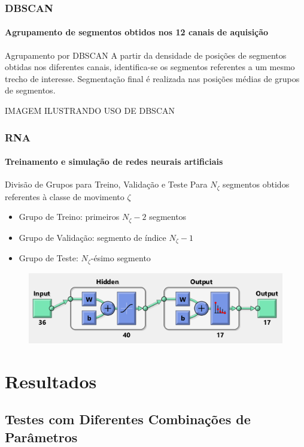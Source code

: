\documentclass{beamer}
\begin{document}
	\begin{frame}
		\frametitle{DBSCAN}
		\framesubtitle{Agrupamento de segmentos obtidos nos 12 canais de aquisição}
		\begin{exampleblock}{Agrupamento por DBSCAN}
			A partir da densidade de posições de segmentos obtidas nos diferentes canais, identifica-se os segmentos referentes a um mesmo trecho de interesse. Segmentação final é realizada nas posições médias de grupos de segmentos.
		\end{exampleblock}
		IMAGEM ILUSTRANDO USO DE DBSCAN
	\end{frame}
	
	\begin{frame}
		\frametitle{RNA}
		\framesubtitle{Treinamento e simulação de redes neurais artificiais}
		\begin{alertblock}{Divisão de Grupos para Treino, Validação e Teste}
			Para $N_\zeta$ segmentos obtidos referentes à classe de movimento $\zeta$ \\
			\begin{itemize}
				\item Grupo de Treino: primeiros $N_\zeta-2$ segmentos
				\item Grupo de Validação: segmento de índice $N_\zeta-1$
				\item Grupo de Teste: $N_\zeta$-ésimo segmento
			\end{itemize}
		\end{alertblock}
		\begin{figure}
			\begin{center}
				\includegraphics[width=\textwidth]{./img/matlabRNA.png}
			\end{center}
		\end{figure}
	\end{frame}

	\section[Resultados]{Resultados}
	\subsection[Testes com Diferentes Combinações de Parâmetros]{Testes com Diferentes Combinações de Parâmetros}
	
\end{document}
